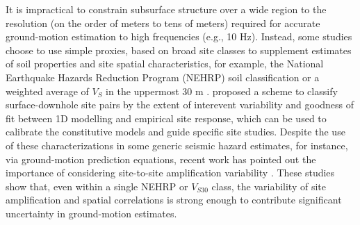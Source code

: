 It is impractical to constrain subsurface structure over a wide region to the resolution (on the order of meters to tens of meters) required for accurate ground-motion estimation to high frequencies (e.g., 10 Hz). Instead, some studies choose to use simple proxies, based on broad site classes to supplement estimates of soil properties and site spatial characteristics, for example, the National Earthquake Hazards Reduction Program (NEHRP) soil classification \citep{bssc2003NEHRPRecommended2003,akkarEmpiricalEquationsPrediction2010} or a weighted average of $V_S$ in the uppermost 30 m \citep[$V_{S30}$, e.g., ][]{abrahamsonSummaryAbrahamsonSilva2008,idrissNGAWest2EmpiricalModel2014}. \citet{thompsonTaxonomySiteResponse2012} proposed a scheme to classify surface-downhole site pairs by the extent of interevent variability and goodness of fit between 1D modelling and empirical site response, which can be used to calibrate the constitutive models and guide specific site studies. Despite the use of these characterizations in some generic seismic hazard estimates, for instance, via ground-motion prediction equations, recent work has pointed out the importance of considering site-to-site amplification variability \citep{atkinsonEarthquakeGroundmotionPrediction2006,atikVariabilityGroundmotionPrediction2010}. These studies show that, even within a single NEHRP or $V_{S30}$ class, the variability of site amplification and spatial correlations is strong enough to contribute significant uncertainty in ground-motion estimates.

